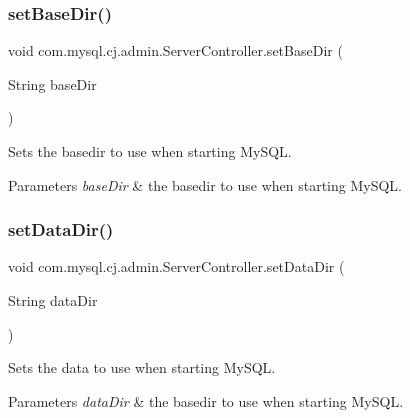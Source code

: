 \subsubsection{\texorpdfstring{set\+Base\+Dir()}{setBaseDir()}}
{\footnotesize\ttfamily void com.\+mysql.\+cj.\+admin.\+Server\+Controller.\+set\+Base\+Dir (\begin{DoxyParamCaption}\item[{String}]{base\+Dir }\end{DoxyParamCaption})}

Sets the basedir to use when starting My\+S\+QL.


\begin{DoxyParams}{Parameters}
{\em base\+Dir} & the basedir to use when starting My\+S\+QL. \\
\hline
\end{DoxyParams}
\mbox{\label{classcom_1_1mysql_1_1cj_1_1admin_1_1_server_controller_a7289db6d097f54749cb6cd16e06c1607}} 
\subsubsection{\texorpdfstring{set\+Data\+Dir()}{setDataDir()}}
{\footnotesize\ttfamily void com.\+mysql.\+cj.\+admin.\+Server\+Controller.\+set\+Data\+Dir (\begin{DoxyParamCaption}\item[{String}]{data\+Dir }\end{DoxyParamCaption})}

Sets the data to use when starting My\+S\+QL.


\begin{DoxyParams}{Parameters}
{\em data\+Dir} & the basedir to use when starting My\+S\+QL. \\
\hline
\end{DoxyParams}
\mbox{\label{classcom_1_1mysql_1_1cj_1_1admin_1_1_server_controller_a6fa88d496021c33b2a334171749cd615}} 
